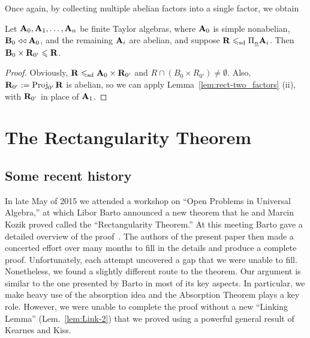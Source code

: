 
  Once again, by collecting multiple abelian factors into a single factor, we obtain
  \begin{corollary}
  \label{cor:S-NA-AF_A-multi}
  Let  %
  $\mathbf{A}_0, \mathbf{A}_1, \dots, \mathbf{A}_n$ be finite Taylor algebras, where
  $\mathbf{A}_0$ is simple nonabelian, $\mathbf{B}_0 \mathrel{\triangleleft\triangleleft} \mathbf{A}_0$, 
  and the remaining $\mathbf{A}_i$ are abelian, %
  and suppose $\mathbf{R} \leqslant_{\mathrm{sd}} \Pi_{\underline{n}}\mathbf{A}_i$.
  Then
  $\mathbf{B}_0 \times \mathbf{R}_{0'} \leqslant \mathbf{R}$.
  \end{corollary}
  \begin{proof}
    Obviously, $\mathbf{R} \leqslant_{\mathrm{sd}} \mathbf{A}_0 \times \mathbf{R}_{0'}$ and 
    $R \cap (B_0 \times R_{0'}) \neq \emptyset$.
    Also, $\mathbf{R}_{0'}:=\operatorname{Proj}_{0'} \mathbf{R}$ is abelian, so we can
    apply Lemma~\ref{lem:rect-two_factors} (ii), with $\mathbf{R}_{0'}$ in place of $\mathbf{A}_1$.
  \end{proof}
  
\section{The Rectangularity Theorem}
\label{sec:tayl-vari-rect}
\subsection{Some recent history}
In late May of 2015 we attended a workshop on ``Open Problems 
in Universal Algebra,'' at which Libor Barto announced a new theorem that he 
and Marcin Kozik proved called the ``Rectangularity Theorem.'' 
At this meeting Barto gave a detailed overview of the proof~\cite{Barto-shanks}.
The authors of the present paper then made a concerted effort over many months
to fill in the details and produce a complete proof.  
Unfortunately, each attempt uncovered a gap that we were unable to fill.
Nonetheless, we found a slightly different route to the theorem.
Our argument is similar to the one presented by Barto in most of 
its key aspects. In particular, we make heavy use of the
absorption idea and the Absorption Theorem plays a key role.  
However, we were unable to complete the proof without a new 
``Linking Lemma'' (Lem.~\ref{lem:Link-2}) that we proved using a powerful 
general result of Kearnes and Kiss.

